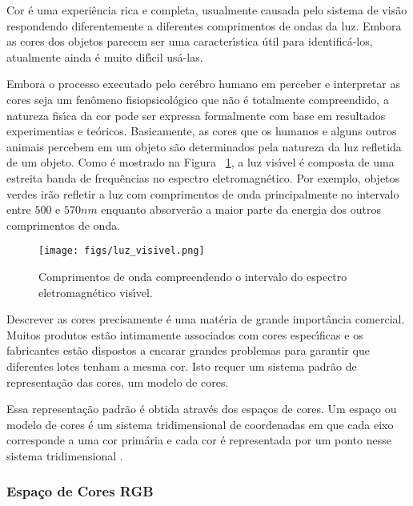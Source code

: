 Cor \'{e} uma experi\^{e}ncia rica e completa, usualmente causada pelo sistema de vis\~{a}o respondendo diferentemente a diferentes 
comprimentos de ondas da luz. Embora as cores dos objetos parecem ser uma caracter\'{\i}stica \'{u}til para identific\'{a}-los, atualmente 
ainda \'{e} muito dif\'{\i}cil us\'{a}-las\cite{FORSYTH:2003}.

Embora o processo executado pelo cer\'{e}bro humano em perceber e interpretar as cores seja um fen\^{o}meno fisiopsicol\'{o}gico que n\~{a}o \'{e} 
totalmente compreendido, a natureza fis\'{\i}ca da cor pode ser expressa formalmente com base em resultados experimentias e te\'{o}ricos. 
Basicamente, as cores que os humanos e alguns outros animais percebem em um objeto s\~{a}o determinados pela natureza da luz refletida 
de um objeto. Como \'{e} mostrado na Figura ~\ref{FIG:LUZVIS}, a luz vis\'{\i}vel \'{e} composta de uma estreita banda de frequ\^{e}ncias no 
espectro eletromagn\'{e}tico. Por exemplo, objetos verdes ir\~{a}o refletir a luz com comprimentos de onda principalmente no intervalo 
entre $500$ e $570 nm$ enquanto absorver\~{a}o a maior parte da energia dos outros comprimentos de onda\cite{GONZALEZ:2008}.

\begin{figure}[h]
\centering
\texttt{[image: figs/luz\_visivel.png]}
\caption[Comprimentos de onda do espectro vis\'{\i}vel]{Comprimentos de onda compreendendo o intervalo do espectro eletromagn\'{e}tico 
vis\'{\i}vel.} \label{FIG:LUZVIS}
\end{figure}

Descrever as cores precisamente \'{e} uma mat\'{e}ria de grande import\^{a}ncia comercial. Muitos produtos est\~{a}o intimamente associados com 
cores espec\'{\i}ficas e os fabricantes est\~{a}o dispostos a encarar grandes problemas para garantir que diferentes lotes tenham a mesma 
cor. Isto requer um sistema padr\~{a}o de representa\c{c}\~{a}o das cores, um modelo de cores\cite{FORSYTH:2003}.

Essa representa\c{c}\~{a}o padr\~{a}o \'{e} obtida atrav\'{e}s dos espa\c{c}os de cores. Um espa\c{c}o ou modelo de cores \'{e} um sistema tridimensional de 
coordenadas em que cada eixo corresponde a uma cor prim\'{a}ria e cada cor \'{e} representada por um ponto nesse sistema tridimensional 
\cite{BARROS:2010}.

\subsubsection{Espa\c{c}o de Cores RGB}

